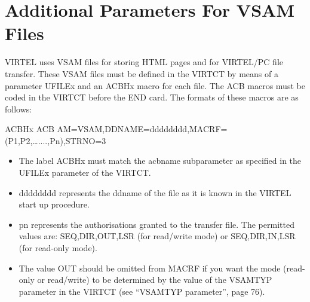 \documentclass[letterpaper,10pt,english]{sphinxmanual}
\begin{document}
\newpage

\ignorespaces 

\section{Additional Parameters For VSAM Files}
\label{\detokenize{Installation_Guide:additional-parameters-for-vsam-files}}\label{\detokenize{Installation_Guide:index-143}}
VIRTEL uses VSAM files for storing HTML pages and for VIRTEL/PC file transfer. These VSAM files must be defined in the VIRTCT by means of a parameter UFILEx and an ACBHx macro for each file. The ACB macros must be coded in the VIRTCT before the END card. The formats of these macros are as follows:

\begin{sphinxVerbatim}[commandchars=\\\{\}]
ACBHx ACB AM=VSAM,DDNAME=dddddddd,MACRF=(P1,P2,…....,Pn),STRNO=3
\end{sphinxVerbatim}
\begin{itemize}
\item {} 
The label ACBHx must match the acbname subparameter as specified in the UFILEx parameter of the VIRTCT.

\item {} 
dddddddd represents the ddname of the file as it is known in the VIRTEL start up procedure.

\item {} 
pn represents the authorisations granted to the transfer file. The permitted values are: SEQ,DIR,OUT,LSR (for read/write mode) or SEQ,DIR,IN,LSR (for read-only mode).

\item {} 
The value OUT should be omitted from MACRF if you want the mode (read-only or read/write) to be determined by the value of the VSAMTYP parameter in the VIRTCT (see “VSAMTYP parameter”, page 76).

\end{itemize}

\newpage
{}\label{\detokenize{Installation_Guide:vvrrig-bookmark72}}
\ignorespaces 
\end{document}

